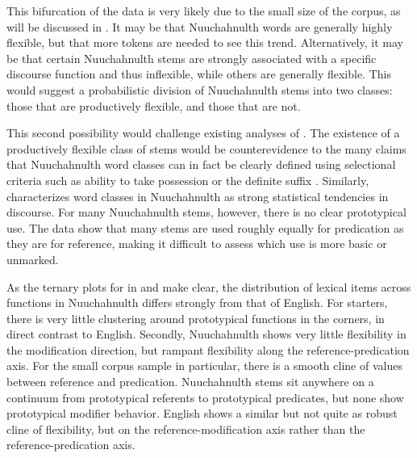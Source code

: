 This bifurcation of the data is very likely due to the small size of the  corpus, as will be discussed in . It may be that Nuuchahnulth words are generally highly flexible, but that more tokens are needed to see this trend. Alternatively, it may be that certain Nuuchahnulth stems are strongly associated with a specific discourse function and thus inflexible, while others are generally flexible. This would suggest a probabilistic division of Nuuchahnulth stems into two classes: those that are productively flexible, and those that are not.

This second possibility would challenge existing analyses of . The existence of a productively flexible class of stems would be counterevidence to the many claims that Nuuchahnulth word classes can in fact be clearly defined using selectional criteria such as ability to take possession or the definite suffix \parencites{Jacobsen1979}{DavisGillonMatthewson2014}{Braithwaite2015}. Similarly, \textcite[57]{Nakayama2001} characterizes word classes in Nuuchahnulth as strong statistical tendencies in discourse. For many Nuuchahnulth stems, however, there is no clear prototypical use. The data show that many stems are used roughly equally for predication as they are for reference, making it difficult to assess which use is more basic or unmarked.

As the ternary plots for  in  and  make clear, the distribution of lexical items across functions in Nuuchahnulth differs strongly from that of English. For starters, there is very little clustering around prototypical functions in the corners, in direct contrast to English. Secondly, Nuuchahnulth shows very little flexibility in the modification direction, but rampant flexibility along the reference-predication axis. For the small corpus sample in particular, there is a smooth cline of values between reference and predication. Nuuchahnulth stems sit anywhere on a continuum from prototypical referents to prototypical predicates, but none show prototypical modifier behavior. English shows a similar but not quite as robust cline of flexibility, but on the reference-modification axis rather than the reference-predication axis.

